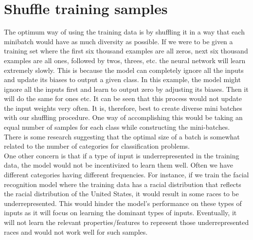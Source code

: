 {\centering{}\par}

\section{Shuffle training samples} 
The optimum way of using the training data is by shuffling it in a way that each minibatch would have as much diversity as possible. If we were to be given a training set where the first six thousand examples are all zeros, next six thousand examples are all ones, followed by twos, threes, etc. the neural network will learn extremely slowly. This is because the model can completely ignore all the inputs and update its biases to output a given class. In this example, the model might ignore all the inputs first and learn to output zero by adjusting its biases. Then it will do the same for ones etc. It can be seen that this process would not update the input weights very often. It is, therefore, best to create diverse mini batches with our shuffling procedure. One way of accomplishing this would be taking an equal number of samples for each class while constructing the mini-batches. There is some research suggesting that the optimal size of a batch is somewhat related to the number of categories for classification problems.\\

One other concern is that if a type of input is underrepresented in the training data, the model would not be incentivized to learn them well. Often we have different categories having different frequencies. For instance, if we train the facial recognition model where the training data has a racial distribution that reflects the racial distribution of the United States, it would result in some races to be underrepresented. This would hinder the model’s performance on these types of inputs as it will focus on learning the dominant types of inputs. Eventually, it will not learn the relevant properties/features to represent those underrepresented races and would not work well for such samples.\\

